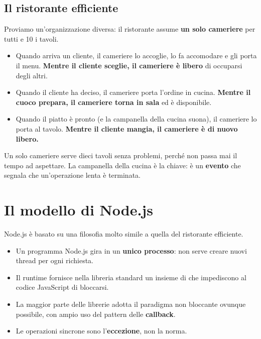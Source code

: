 \subsection{Il ristorante efficiente}

Proviamo un'organizzazione diversa: il ristorante assume \textbf{un solo
cameriere} per tutti e 10 i tavoli.

\begin{itemize}
  \item Quando arriva un cliente, il cameriere lo accoglie, lo fa accomodare e
        gli porta il menu. \textbf{Mentre il cliente sceglie, il cameriere è
        libero} di occuparsi degli altri.
  \item Quando il cliente ha deciso, il cameriere porta l'ordine in cucina.
        \textbf{Mentre il cuoco prepara, il cameriere torna in sala} ed è
        disponibile.
  \item Quando il piatto è pronto (e la campanella della cucina suona), il
        cameriere lo porta al tavolo. \textbf{Mentre il cliente mangia, il
        cameriere è di nuovo libero.}
\end{itemize}

Un solo cameriere serve dieci tavoli senza problemi, perché non passa mai il
tempo ad aspettare. La campanella della cucina è la chiave: è un \textbf{evento}
che segnala che un'operazione lenta è terminata.

\section{Il modello di Node.js}

Node.js è basato su una filosofia molto simile a quella del ristorante
efficiente.

\begin{itemize}
  \item Un programma Node.js gira in un \textbf{unico processo}: non serve
        creare nuovi thread per ogni richiesta.
  \item Il runtime fornisce nella libreria standard un insieme di
         che impediscono al codice JavaScript
        di bloccarsi.
  \item La maggior parte delle librerie adotta il paradigma non bloccante
        ovunque possibile, con ampio uso del pattern delle \textbf{callback}.
  \item Le operazioni sincrone sono l'\textbf{eccezione}, non la norma.
\end{itemize}

